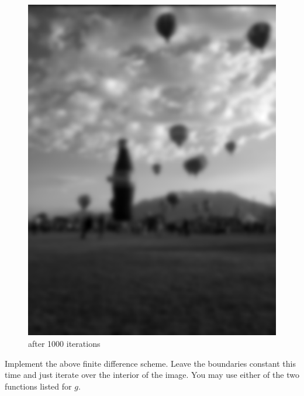 \begin{figure}[ht]
\begin{minipage}[b]{0.45\linewidth}
\includegraphics[width=\textwidth]{baloon1000}
\caption*{after 1000 iterations}
\end{minipage}
\end{figure}
\vfill
\clearpage

\begin{problem}
Implement the above finite difference scheme.
Leave the boundaries constant this time and just iterate over the interior of the image.
You may use either of the two functions listed for $g$.
\end{problem}

